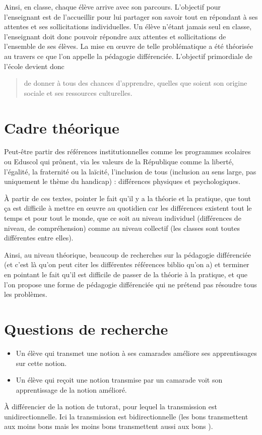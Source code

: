 \documentclass[a4paper]{article}
\begin{document}
Ainsi, en classe, chaque élève arrive avec son parcours. L'objectif pour l'enseignant est de l'accueillir pour lui partager son savoir tout en répondant à ses attentes et ses sollicitations individuelles. Un élève n'étant jamais seul en classe, l'enseignant doit donc pouvoir répondre aux attentes et sollicitations de l'ensemble de ses élèves. La mise en œuvre de telle problématique a été théorisée au travers ce que l'on appelle la pédagogie différenciée. L'objectif primordiale de l'école devient donc
\begin{quote} de donner à tous des chances d'apprendre, quelles que soient son origine sociale et ses ressources culturelles. \cite{Perrenoud}\end{quote}\newpage

\section{Cadre théorique}
Peut-être partir des références institutionnelles comme les programmes scolaires ou Eduscol qui prônent, via les \og valeurs de la République \fg{} comme la liberté, l'égalité, la fraternité ou la laïcité, l'inclusion de tous (inclusion au sens large, pas uniquement le thème du handicap) : différences physiques et psychologiques.

À partir de ces textes, pointer le fait qu'il y a la théorie et la pratique, que tout ça est difficile à mettre en œuvre au quotidien car les différences existent tout le temps et pour tout le monde, que ce soit au niveau individuel (différences de niveau, de compréhension) comme au niveau collectif (les classes sont toutes différentes entre elles).

Ainsi, au niveau théorique, beaucoup de recherches sur la pédagogie différenciée (et c'est là qu'on peut citer les différentes références biblio qu'on a) et terminer en pointant le fait qu'il est difficile de passer de la théorie à la pratique, et que l'on propose une forme de pédagogie différenciée qui ne prétend pas résoudre tous les problèmes.\newpage

\section{Questions de recherche}
\begin{itemize}
	\item Un élève qui transmet une notion à ses camarades améliore ses apprentissages sur cette notion.
	\item Un élève qui reçoit une notion transmise par un camarade voit son apprentissage de la notion amélioré.
\end{itemize}
À différencier de la notion de tutorat, pour lequel la transmission est unidirectionnelle. Ici la transmission est bidirectionnelle (les \og bons \fg{} transmettent aux \og moins bons \fg{} mais les \og moins bons \fg{} transmettent aussi aux \og bons \fg{}).\newpage
\end{document}
